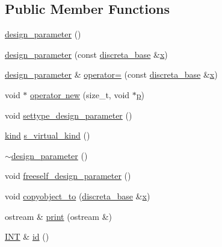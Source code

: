 \subsection*{Public Member Functions}
\begin{DoxyCompactItemize}
\item 
\mbox{\hyperlink{classdesign__parameter_a1952bb71b52e00bcb579d3eafd809f05}{design\+\_\+parameter}} ()
\item 
\mbox{\hyperlink{classdesign__parameter_a4ea566da8e77452b92027b2a2c8df7ce}{design\+\_\+parameter}} (const \mbox{\hyperlink{classdiscreta__base}{discreta\+\_\+base}} \&\mbox{\hyperlink{alphabet2_8_c_a6150e0515f7202e2fb518f7206ed97dc}{x}})
\item 
\mbox{\hyperlink{classdesign__parameter}{design\+\_\+parameter}} \& \mbox{\hyperlink{classdesign__parameter_afd2b9a322632021e0e3893c386cfc196}{operator=}} (const \mbox{\hyperlink{classdiscreta__base}{discreta\+\_\+base}} \&\mbox{\hyperlink{alphabet2_8_c_a6150e0515f7202e2fb518f7206ed97dc}{x}})
\item 
void $\ast$ \mbox{\hyperlink{classdesign__parameter_a3a494f1e4e845ee4c70889675cfbce24}{operator new}} (size\+\_\+t, void $\ast$\mbox{\hyperlink{alphabet2_8_c_a533391314665d6bf1b5575e9a9cd8552}{p}})
\item 
void \mbox{\hyperlink{classdesign__parameter_a8b19d277f2b7d09c2531a527dfc0359e}{settype\+\_\+design\+\_\+parameter}} ()
\item 
\mbox{\hyperlink{discreta_8h_aaf25ee7e2306d78c74ec7bc48f092e81}{kind}} \mbox{\hyperlink{classdesign__parameter_af41eca1f66a8113dd0b892b26d791028}{s\+\_\+virtual\+\_\+kind}} ()
\item 
\mbox{\hyperlink{classdesign__parameter_af7927d3b3282e33daf8bf7106ffb3e96}{$\sim$design\+\_\+parameter}} ()
\item 
void \mbox{\hyperlink{classdesign__parameter_a0e7274960527530080b673a9d9e53fed}{freeself\+\_\+design\+\_\+parameter}} ()
\item 
void \mbox{\hyperlink{classdesign__parameter_a4e0434c6fd0d805543d730b40fc8e01f}{copyobject\+\_\+to}} (\mbox{\hyperlink{classdiscreta__base}{discreta\+\_\+base}} \&\mbox{\hyperlink{alphabet2_8_c_a6150e0515f7202e2fb518f7206ed97dc}{x}})
\item 
ostream \& \mbox{\hyperlink{classdesign__parameter_ac9c431a5408809b0c229eacaa924781b}{print}} (ostream \&)
\item 
\mbox{\hyperlink{galois_8h_a09fddde158a3a20bd2dcadb609de11dc}{I\+NT}} \& \mbox{\hyperlink{classdesign__parameter_ae83312a3e4d40a0ce15b649d3fe3ff19}{id}} ()

\end{DoxyCompactItemize}
